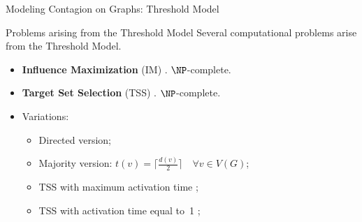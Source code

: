 \documentclass[10pt,aspectratio=169,english]{beamer}
\begin{document}
\begin{frame}{Modeling Contagion on Graphs: Threshold Model}
	\only<6>{
		\begin{figure}
			\centering
			\tikz \graph [spring layout, nodes={draw,circle}, horizontal=a to g] {
				a[fill=red, label=below:{\textcolor{red}{2}}] -- {b[fill=red, label=left:{\textcolor{red}{3}}], c[fill=red, label=above:{\textcolor{red}{1}}]};
				
				b -- {c, d[fill=red, label=below:{\textcolor{red}{1}}], e[fill=red, label=above:{\textcolor{red}{3}}]};
				d -- {[clique] e, f[fill=red, label=above:{\textcolor{red}{2}}], g[fill=red, label=below:{\textcolor{red}{2}}]};
			};
		\end{figure}
	}
\end{frame}

\begin{frame}{Problems arising from the Threshold Model}
	Several computational problems arise from the Threshold Model.
	\begin{itemize}
		\item<1-> \textbf{Influence Maximization} (\textsc{IM}) \parencite{kempe}. $\NP$-complete.
		\item<1-> \textbf{Target Set Selection} (\textsc{TSS}) \parencite{DREYER2009}. $\NP$-complete.
		\item<1-> Variations:
		\begin{itemize}
			\item<1-> Directed version;
			\item<1-> Majority version: $t(v) = \lceil \frac{d(v)}{2} \rceil \quad \forall v \in V(G)$;
			\item<1-> \textsc{TSS} with maximum activation time \parencite{Keiler2023, Flocchini2003, Marcilon2018};
			\item<1-> \textsc{TSS} with activation time equal to~1 \parencite{Arajo2023};
		\end{itemize}
	\end{itemize}
\end{frame}

%	
\end{document}
